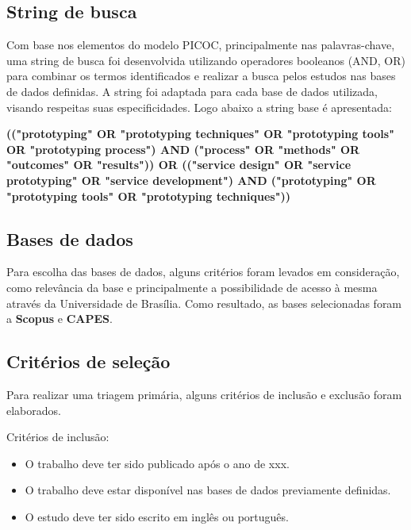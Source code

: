 \subsection{String de busca}

Com base nos elementos do modelo PICOC, principalmente nas palavras-chave, uma string de busca foi desenvolvida utilizando operadores booleanos (AND, OR) para combinar os termos identificados e realizar a busca pelos estudos nas bases de dados definidas. A string foi adaptada para cada base de dados utilizada, visando respeitas suas especificidades. Logo abaixo a string base é apresentada:


\textbf{(("prototyping" OR "prototyping techniques" OR "prototyping tools" OR "prototyping process") AND 
("process" OR "methods" OR "outcomes" OR "results")) 
\newline      OR \newline 
(("service design" OR "service prototyping" OR "service development") AND 
("prototyping" OR "prototyping tools" OR "prototyping techniques"))}

\subsection{Bases de dados}

Para escolha das bases de dados, alguns critérios foram levados em consideração, como relevância da base e principalmente a possibilidade de acesso à mesma através da Universidade de Brasília. Como resultado, as bases selecionadas foram a \textbf{Scopus} e \textbf{CAPES}.

\subsection{Critérios de seleção}

Para realizar uma triagem primária, alguns critérios de inclusão e exclusão foram elaborados.

Critérios de inclusão:
\begin{itemize}
	\item O trabalho deve ter sido publicado após o ano de xxx.
	
	\item O trabalho deve estar disponível nas bases de dados previamente definidas.
	
	\item O estudo deve ter sido escrito em inglês ou português.
	
\end{itemize}

